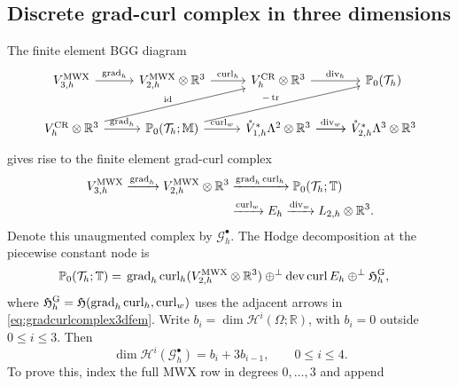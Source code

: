 \documentclass[10pt]{amsart}
\numberwithin{equation}{section}
\newcommand{\curl}{\operatorname{curl}}
\renewcommand{\div}{\operatorname{div}}
\newcommand{\grad}{\operatorname{grad}}
\newcommand{\tr}{\operatorname{tr}}
\newcommand{\dev}{\operatorname{dev}}
\begin{document}
\subsection{Discrete grad-curl complex in three dimensions}
The finite element BGG diagram
\begin{equation*}
\begin{tikzcd}
V_{3,h}^{\rm MWX}
\arrow{r}{\grad_h}
&
V_{2,h}^{\rm MWX}\otimes\mathbb R^3
 \arrow{r}{\curl_h}
 &
V_{h}^{\rm CR}\otimes\mathbb R^3
 \arrow{r}{\div_h}
 & \mathbb P_0(\mathcal T_h)
 \\
V_{h}^{\rm CR}\otimes\mathbb R^3
 \arrow[urr,swap,"{\rm id}"'] 
 \arrow{r}{\grad_h}
 & 
\mathbb P_0(\mathcal T_h; \mathbb M)
 \arrow[urr,"-\tr"] \arrow{r}{\curl_w}
 & 
\mathring{V}_{1,h}^{*}\Lambda^2\otimes\mathbb R^3 
\arrow{r}{\div_w} \arrow[r] 
 &\mathring{V}_{2,h}^{*}\Lambda^3\otimes\mathbb R^3
\end{tikzcd}
\end{equation*}
gives rise to the finite element grad-curl complex
\begin{equation}\label{eq:gradcurlcomplex3dfem}
\begin{aligned}
V_{3,h}^{\rm MWX}\xrightarrow{\grad_h}
V_{2,h}^{\rm MWX}\otimes\mathbb R^3
&\xrightarrow{\grad_h\curl_h}\mathbb P_0(\mathcal T_h;\mathbb T)\\
&\xrightarrow{\curl_w}E_h
\xrightarrow{\div_w}L_{2,h}\otimes\mathbb R^3.
\end{aligned}
\end{equation}
Denote this unaugmented complex by $\mathcal G_h^\bullet$.
The Hodge decomposition at the piecewise constant node is
\begin{align*}
\mathbb P_0(\mathcal T_h;\mathbb T)
={}&\grad_h\curl_h(V_{2,h}^{\rm MWX}\otimes\mathbb R^3)
\oplus^\perp\dev\curl E_h
\oplus^\perp\mathfrak H_h^{\rm G},
\end{align*}
where $\mathfrak H_h^{\rm G}=\mathfrak H(\grad_h\curl_h,\curl_w)$
uses the adjacent arrows in \eqref{eq:gradcurlcomplex3dfem}.
Write $b_i=\dim \mathscr H^i(\Omega;\mathbb R)$, with $b_i=0$ outside
$0\leq i\leq3$. Then
\begin{equation}\label{eq:gradcurlcohomology3d}
\dim \mathscr H^i(\mathcal G_h^\bullet)=b_i+3b_{i-1},\qquad 0\leq i\leq4.
\end{equation}
To prove this, index the full MWX row in degrees $0,\ldots,3$ and append
\end{document}
